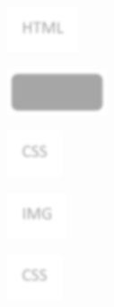\documentclass[12pt]{article}
\begin{document}
\begin{figure}[H]
\includegraphics[width=0.5\linewidth]{page78-image-6.png}
\end{figure}
\begin{figure}[H]
\includegraphics[width=0.5\linewidth]{page78-image-7.png}
\end{figure}
\begin{figure}[H]
\includegraphics[width=0.5\linewidth]{page78-image-8.png}
\end{figure}
\begin{figure}[H]
\includegraphics[width=0.5\linewidth]{page78-image-9.png}
\end{figure}
\begin{figure}[H]
\includegraphics[width=0.5\linewidth]{page78-image-10.png}
\end{figure}
\end{document}
